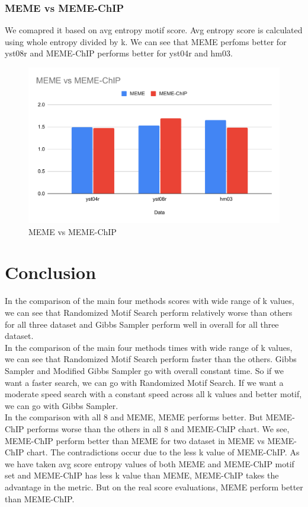 \documentclass{article}
\begin{document}
\subsubsection{MEME vs MEME-ChIP}
We comapred it based on avg entropy motif score. Avg entropy score is calculated using whole entropy divided by k. We can see that MEME perfoms better for yst08r and MEME-ChIP performs better for yst04r and hm03.
\begin{figure}[!hptb]
    \centering
    \includegraphics[scale=0.7]{Figs/MEME vs MEME-ChIP.pdf}
    \caption{MEME vs MEME-ChIP}    
\end{figure}
\clearpage
\section{Conclusion}
In the comparison of the main four methods scores with wide range of k values, we can see that Randomized Motif Search perform relatively worse than others for all three dataset and Gibbs Sampler perform well in overall for all three dataset.\\
In the comparison of the main four methods times with wide range of k values, we can see that Randomized Motif Search perform faster than the others. Gibbs Sampler and Modified Gibbs Sampler go with overall constant time. So if we want a faster search, we can go with Randomized Motif Search. If we want a moderate speed search with a constant speed across all k values and better motif, we can go with Gibbs Sampler.\\
In the comparison with all 8 and MEME, MEME performs better. But MEME-ChIP performs worse than the others in all 8 and MEME-ChIP chart. We see, MEME-ChIP perform better than MEME for two dataset in MEME vs MEME-ChIP chart. The contradictions occur due to the less k value of MEME-ChIP. As we have taken avg score entropy values of both MEME and MEME-ChIP motif set and MEME-ChIP has less k value than MEME, MEME-ChIP takes the advantage in the metric. But on the real score evaluations, MEME perform better than MEME-ChIP.


\end{document}
